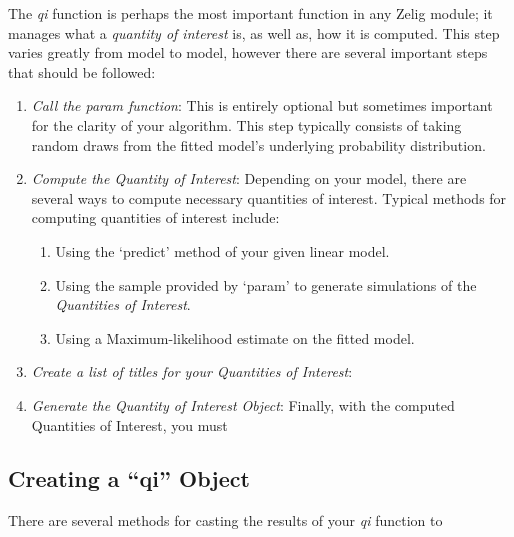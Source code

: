 \documentclass[a4paper, 11pt]{article}
\begin{document}
The \emph{qi} function is perhaps the most important function in any Zelig module; it manages what a \emph{quantity of interest} is, as well as, how it is computed.  This step varies greatly from model to model, however there are several important steps that should be followed:

\begin{enumerate}
	\item{\emph{Call the param function}:  This is entirely optional but sometimes important for the clarity of your algorithm.  This step typically consists of taking random draws from the fitted model's underlying probability distribution.}
	\item{\emph{Compute the Quantity of Interest}: Depending on your model, there are several ways to compute necessary quantities of interest.  Typical methods for computing quantities of interest include:
		\begin{enumerate}
			\item{Using the `predict' method of your given linear model.}
			\item{Using the sample provided by `param' to generate simulations of the \emph{Quantities of Interest}.}
			\item{Using a Maximum-likelihood estimate on the fitted model.}
		\end{enumerate}}
	\item{\emph{Create a list of titles for your Quantities of Interest}:}
	\item{\emph{Generate the Quantity of Interest Object}: Finally, with the computed Quantities of Interest, you must }
\end{enumerate}

\subsection{Creating a ``qi'' Object}

There are several methods for casting the results of your \emph{qi} function to 
\end{document}
